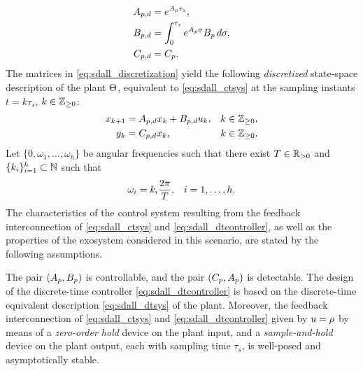 \begin{subequations}
  \label{eq:sdall_discretization}
  \begin{align}
    A_{p,d} &= e^{A_p\tau_s},\\
    B_{p,d} &= \int_{0}^{\tau_s} e^{A_p\sigma}B_p\,d\sigma,\\
    C_{p,d} &= C_p.
  \end{align}
\end{subequations}
The matrices in \eqref{eq:sdall_discretization} yield the following \emph{discretized} state-space description of the plant $\Theta$, equivalent to \eqref{eq:sdall_ctsys} at the sampling instants $t=k\tau_s$, $k\in\mathbb{Z}_{\geq 0}$:
\begin{subequations}
  \label{eq:sdall_dtsys}
  \begin{align}
    x_{k+1} &= A_{p,d}x_k + B_{p,d}u_k, & k\in\mathbb{Z}_{\geq 0},\\
    y_k &= C_{p,d}x_k, & k\in\mathbb{Z}_{\geq 0}.
  \end{align}
\end{subequations}
Let $\{0,\omega_1,\dotsc,\omega_h\}$ be angular frequencies such that there exist $T\in\mathbb{R}_{>0}$ and $\{k_i\}_{i=1}^{h}\subset\mathbb{N}$ such that
\begin{align}
  \label{eq:sdall_exofreqs}
  \omega_i &= k_i\frac{2\pi}{T}, & i=1,\dotsc,h.
\end{align}
The characteristics of the control system resulting from the feedback interconnection of \eqref{eq:sdall_ctsys} and \eqref{eq:sdall_dtcontroller}, as well as the properties of the exosystem considered in this scenario, are stated by the following assumptions.
\begin{assumption}
  \label{ass:sdall_controller}
  The pair $(A_p,B_p)$ is controllable, and the pair $(C_p,A_p)$ is detectable.
  The design of the discrete-time controller \eqref{eq:sdall_dtcontroller} is based on the discrete-time equivalent description \eqref{eq:sdall_dtsys} of the plant. Moreover, the feedback interconnection of \eqref{eq:sdall_ctsys} and \eqref{eq:sdall_dtcontroller} given by $u=\rho$ by means of a \emph{zero-order hold} device on the plant input, and a \emph{sample-and-hold} device on the plant output, each with sampling time $\tau_s$, is well-posed and asymptotically stable.\closestatement
\end{assumption}
